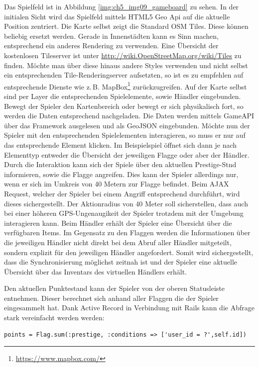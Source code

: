 Das Spielfeld ist in Abbildung \ref{img:ch5_img09_gameboard} zu sehen. In der initialen Sicht wird das Spielfeld mittels HTML5 Geo Api auf die aktuelle Position zentriert. Die Karte selbst zeigt die Standard OSM Tiles. Diese können beliebig ersetzt werden. Gerade in Innenstädten kann es Sinn machen, entsprechend ein anderes Rendering zu verwenden. Eine Übersicht der kostenlosen Tileserver ist unter \url{http://wiki.OpenStreetMap.org/wiki/Tiles} zu finden. Möchte man über diese hinaus andere Styles verwenden und nicht selbst ein entsprechenden Tile-Renderingserver aufsetzten, so ist es zu empfehlen auf entsprechende Dienste wie z.\,B. MapBox\footnote{\url{https://www.mapbox.com/}} zurückzugreifen. Auf der Karte selbst sind per Layer die entsprechenden Spielelemente, sowie Händler eingebunden. Bewegt der Spieler den Kartenbereich oder bewegt er sich physikalisch fort, so werden die Daten entsprechend nachgeladen. Die Daten werden mittels GameAPI über das Framework ausgelesen und als GeoJSON eingebunden. Möchte nun der Spieler mit den entsprechenden Spielelementen interagieren, so muss er nur auf das entsprechende Element klicken. Im Beispielspiel öffnet sich dann je nach Elementtyp entweder die Übersicht der jeweiligen Flagge oder aber der Händler. Durch die Interaktion kann sich der Spiele über den aktuellen Prestige-Stnd informieren, sowie die Flagge angreifen. Dies kann der Spieler allerdings nur, wenn er sich im Umkreis von 40 Metern zur Flagge befindet. Beim AJAX Request, welcher der Spieler bei einem Angriff entsprechend durchführt, wird dieses sichergestellt. Der Aktionradius von 40 Meter soll sicherstellen, dass auch bei einer höheren GPS-Ungenaugikeit der Spieler trotzdem mit der Umgebung interagieren kann.
Beim Händler erhält der Spieler eine Übersicht über die verfügbaren Items. Im Gegensatz zu den Flaggen werden die Informationen über die jeweiligen Händler nicht direkt bei dem Abruf aller Händler mitgeteilt, sondern explizit für den jeweiligen Händler angefordert. Somit wird sichergestellt, dass die Synchronisierung möglichst zeitnah ist und der Spieler eine aktuelle Übersicht über das Inventars des virtuellen Händlers erhält.

Den aktuellen Punktestand kann der Spieler von der oberen Statusleiste entnehmen. Dieser berechnet sich anhand aller Flaggen die der Spieler eingesammelt hat. Dank Active Record in Verbindung mit Rails kann die Abfrage stark vereinfacht werden werden:
\\
\lstset{
   language=Ruby
}

\begin{lstlisting}[caption=Ruby - Abfrage der Spielerpunkte, label=code:ch5:activerecord01]
points = Flag.sum(:prestige, :conditions => ['user_id = ?',self.id])
\end{lstlisting}

